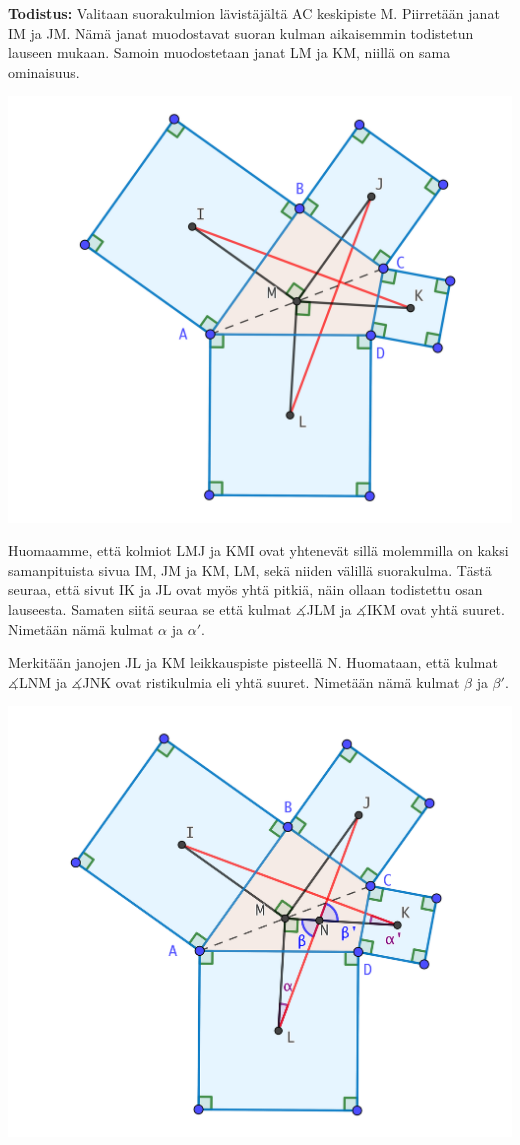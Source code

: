 \documentclass{scrartcl}
\begin{document}
\smallskip
\textbf{Todistus:} Valitaan suorakulmion lävistäjältä AC keskipiste M. Piirretään janat IM ja JM. Nämä janat muodostavat suoran kulman aikaisemmin todistetun lauseen mukaan. Samoin muodostetaan janat LM ja KM, niillä on sama ominaisuus.
\begin{center}
    \includegraphics[scale=0.3]{todistus1}
\end{center}
Huomaamme, että kolmiot LMJ ja KMI ovat yhtenevät sillä molemmilla on kaksi samanpituista sivua IM, JM ja KM, LM, sekä niiden välillä suorakulma. Tästä seuraa, että sivut IK ja JL ovat myös yhtä pitkiä, näin ollaan todistettu osan lauseesta. Samaten siitä seuraa se että kulmat $\measuredangle$JLM ja $\measuredangle$IKM ovat yhtä suuret. Nimetään nämä kulmat $\alpha$ ja $\alpha'$.

Merkitään janojen JL ja KM leikkauspiste pisteellä N. Huomataan, että kulmat $\measuredangle$LNM ja $\measuredangle$JNK ovat ristikulmia eli yhtä suuret. Nimetään nämä kulmat $\beta$ ja $\beta'$.

\begin{center}
    \includegraphics[scale=0.3]{todistuksenjatkoa.png}
\end{center}
\end{document}
